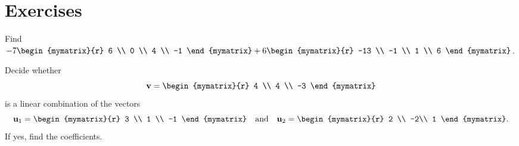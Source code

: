 \section*{Exercises}

\begin{enumialphparenastyle}

\begin{ex}
  Find $-7\begin{mymatrix}{r}
    6 \\
    0 \\
    4 \\
    -1
  \end{mymatrix} +6\begin{mymatrix}{r}
    -13 \\
    -1 \\
    1 \\
    6
  \end{mymatrix} $. 
\end{ex}


\begin{ex}
  Decide whether 
  \begin{equation*}
    \vect{v}= \begin{mymatrix}{r}
      4 \\
      4 \\
      -3
    \end{mymatrix}
  \end{equation*}
  is a linear combination of the vectors 
  \begin{equation*}
    \vect{u}_1 = \begin{mymatrix}{r}
      3 \\
      1 \\
      -1
    \end{mymatrix}
    \quad\mbox{and}\quad
    \vect{u}_2 = 
    \begin{mymatrix}{r}
      2 \\
      -2\\
      1
    \end{mymatrix}.
  \end{equation*}
  If yes, find the coefficients.
  

\end{ex}
\end{enumialphparenastyle}

